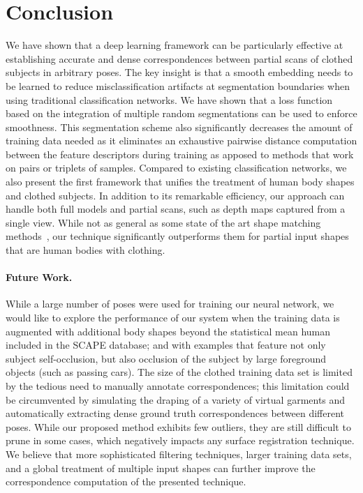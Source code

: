 \documentclass[10pt,twocolumn,letterpaper]{article}
\begin{document}
\section{Conclusion}

We have shown that a deep learning framework can be particularly effective at establishing accurate and dense correspondences between partial scans of clothed subjects in arbitrary poses. The key insight is that a smooth embedding needs to be learned to reduce misclassification artifacts at segmentation boundaries when using traditional classification networks. We have shown that a loss function based on the integration of multiple random segmentations can be used to enforce smoothness. This segmentation scheme also significantly decreases the amount of training data needed as it eliminates an exhaustive pairwise distance computation between the feature descriptors during training as apposed to methods that work on pairs or triplets of samples. Compared to existing classification networks, we also present the first framework that unifies the treatment of human body shapes and clothed subjects. In addition to its remarkable efficiency, our approach can handle both full models and partial scans, such as depth maps captured from a single view. While not as general as some state of the art shape matching methods~\cite{Kim11,Lipman:2009:MVS,Rodola_2014_CVPR,chen15}, our technique significantly outperforms them for partial input shapes that are human bodies with clothing.

\paragraph{Future Work.} While a large number of poses were used for training our neural network, we would like to explore the performance of our system when the training data is augmented with additional body shapes beyond the statistical mean human included in the SCAPE database; and with examples that feature not only subject self-occlusion, but also occlusion of the subject by large foreground objects (such as passing cars). The size of the clothed training data set is limited by the tedious need to manually annotate correspondences; this limitation could be circumvented by simulating the draping of a variety of virtual garments and automatically extracting dense ground truth correspondences between different poses. While our proposed method exhibits few outliers, they are still difficult to prune in some cases, which negatively impacts any surface registration technique. We believe that more sophisticated filtering techniques, larger training data sets, and a global treatment of multiple input shapes can further improve the correspondence computation of the presented technique.
\end{document}
